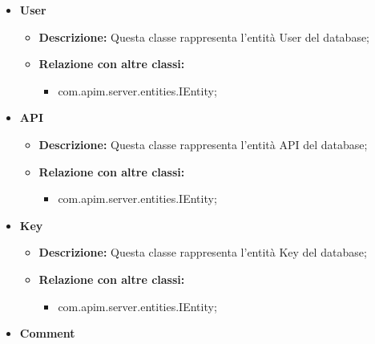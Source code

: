 {{{{{{\begin{itemize}
\begin{itemize}
\begin{itemize}
              \item com.apim.server.entities.Key;
              \item com.apim.server.entities.Comment;
              \item com.apim.server.entities.Acquisto;
              \item com.apim.server.entities.Categoria;
            \end{itemize}
          \end{itemize}
          \item \textbf{User}
          \begin{itemize}
            \item \textbf{Descrizione:} Questa classe rappresenta l'entità User del database;
            \item \textbf{Relazione con altre classi:}
            \begin{itemize}
              \item com.apim.server.entities.IEntity;
            \end{itemize}
          \end{itemize}
          \item \textbf{API}
          \begin{itemize}
            \item \textbf{Descrizione:} Questa classe rappresenta l'entità API del database;
            \item \textbf{Relazione con altre classi:}
            \begin{itemize}
              \item com.apim.server.entities.IEntity;
            \end{itemize}
          \end{itemize}
          \item \textbf{Key}
          \begin{itemize}
            \item \textbf{Descrizione:} Questa classe rappresenta l'entità Key del database;
            \item \textbf{Relazione con altre classi:}
            \begin{itemize}
              \item com.apim.server.entities.IEntity;
            \end{itemize}
          \end{itemize}
          \item \textbf{Comment}
          \begin{itemize}

\end{itemize}
\end{itemize}}}}}}}
